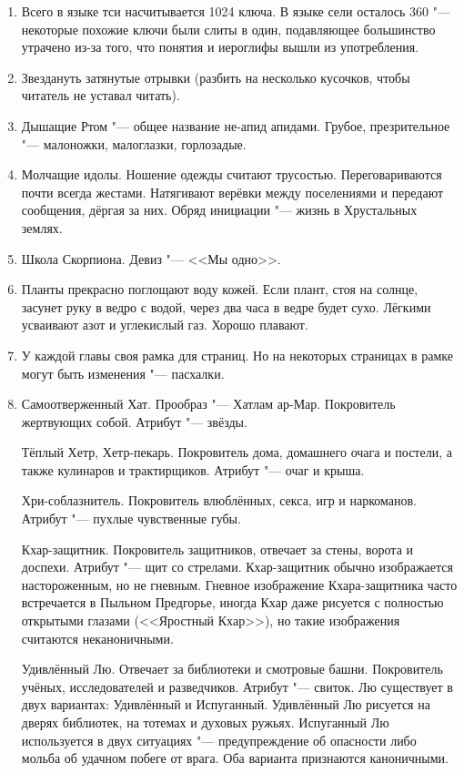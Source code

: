 \begin{enumerate}
\item Всего в языке тси насчитывается 1024 ключа.
В языке сели осталось 360 "--- некоторые похожие ключи были слиты в один, подавляющее большинство утрачено из-за того, что понятия и иероглифы вышли из употребления.

\item Звездануть затянутые отрывки (разбить на несколько кусочков, чтобы читатель не уставал читать).

\item Дышащие Ртом "--- общее название не-апид апидами.
Грубое, презрительное "--- малоножки, малоглазки, горлозадые.

\item Молчащие идолы.
Ношение одежды считают трусостью.
Переговариваются почти всегда жестами.
Натягивают верёвки между поселениями и передают сообщения, дёргая за них.
Обряд инициации "--- жизнь в Хрустальных землях.

\item Школа Скорпиона.
Девиз "--- <<Мы одно>>.

\item Планты прекрасно поглощают воду кожей.
Если плант, стоя на солнце, засунет руку в ведро с водой, через два часа в ведре будет сухо.
Лёгкими усваивают азот и углекислый газ.
Хорошо плавают.

\item У каждой главы своя рамка для страниц.
Но на некоторых страницах в рамке могут быть изменения "--- пасхалки.

\item Самоотверженный Хат.
Прообраз "--- Хатлам ар-Мар.
Покровитель жертвующих собой.
Атрибут "--- звёзды.

Тёплый Хетр, Хетр-пекарь.
Покровитель дома, домашнего очага и постели, а также кулинаров и трактирщиков.
Атрибут "--- очаг и крыша.

Хри-соблазнитель.
Покровитель влюблённых, секса, игр и наркоманов.
Атрибут "--- пухлые чувственные губы.

Кхар-защитник.
Покровитель защитников, отвечает за стены, ворота и доспехи.
Атрибут "--- щит со стрелами.
Кхар-защитник обычно изображается настороженным, но не гневным.
Гневное изображение Кхара-защитника часто встречается в Пыльном Предгорье, иногда Кхар даже рисуется с полностью открытыми глазами (<<Яростный Кхар>>), но такие изображения считаются неканоничными.

Удивлённый Лю.
Отвечает за библиотеки и смотровые башни.
Покровитель учёных, исследователей и разведчиков.
Атрибут "--- свиток.
Лю существует в двух вариантах: Удивлённый и Испуганный.
Удивлённый Лю рисуется на дверях библиотек, на тотемах и духовых ружьях.
Испуганный Лю используется в двух ситуациях "--- предупреждение об опасности либо мольба об удачном побеге от врага.
Оба варианта признаются каноничными.


\end{enumerate}
